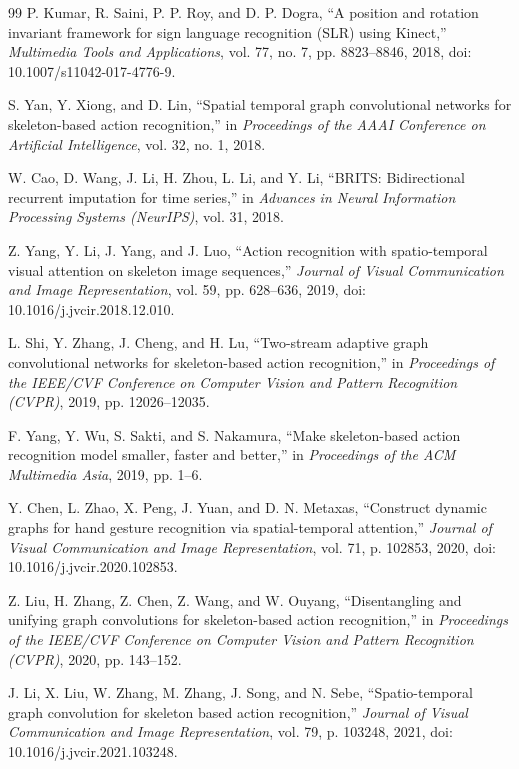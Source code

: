 \documentclass[10pt,twocolumn]{article}
\begin{document}
\begin{thebibliography}{99}
P. Kumar, R. Saini, P. P. Roy, and D. P. Dogra, ``A position and rotation invariant framework for sign language recognition (SLR) using Kinect,'' \textit{Multimedia Tools and Applications}, vol. 77, no. 7, pp. 8823--8846, 2018, doi: 10.1007/s11042-017-4776-9.

S. Yan, Y. Xiong, and D. Lin, ``Spatial temporal graph convolutional networks for skeleton-based action recognition,'' in \textit{Proceedings of the AAAI Conference on Artificial Intelligence}, vol. 32, no. 1, 2018.

W. Cao, D. Wang, J. Li, H. Zhou, L. Li, and Y. Li, ``BRITS: Bidirectional recurrent imputation for time series,'' in \textit{Advances in Neural Information Processing Systems (NeurIPS)}, vol. 31, 2018.

Z. Yang, Y. Li, J. Yang, and J. Luo, ``Action recognition with spatio-temporal visual attention on skeleton image sequences,'' \textit{Journal of Visual Communication and Image Representation}, vol. 59, pp. 628--636, 2019, doi: 10.1016/j.jvcir.2018.12.010.

L. Shi, Y. Zhang, J. Cheng, and H. Lu, ``Two-stream adaptive graph convolutional networks for skeleton-based action recognition,'' in \textit{Proceedings of the IEEE/CVF Conference on Computer Vision and Pattern Recognition (CVPR)}, 2019, pp. 12026--12035.

F. Yang, Y. Wu, S. Sakti, and S. Nakamura, ``Make skeleton-based action recognition model smaller, faster and better,'' in \textit{Proceedings of the ACM Multimedia Asia}, 2019, pp. 1--6.

Y. Chen, L. Zhao, X. Peng, J. Yuan, and D. N. Metaxas, ``Construct dynamic graphs for hand gesture recognition via spatial-temporal attention,'' \textit{Journal of Visual Communication and Image Representation}, vol. 71, p. 102853, 2020, doi: 10.1016/j.jvcir.2020.102853.

Z. Liu, H. Zhang, Z. Chen, Z. Wang, and W. Ouyang, ``Disentangling and unifying graph convolutions for skeleton-based action recognition,'' in \textit{Proceedings of the IEEE/CVF Conference on Computer Vision and Pattern Recognition (CVPR)}, 2020, pp. 143--152.

J. Li, X. Liu, W. Zhang, M. Zhang, J. Song, and N. Sebe, ``Spatio-temporal graph convolution for skeleton based action recognition,'' \textit{Journal of Visual Communication and Image Representation}, vol. 79, p. 103248, 2021, doi: 10.1016/j.jvcir.2021.103248.


\end{thebibliography}
\end{document}

